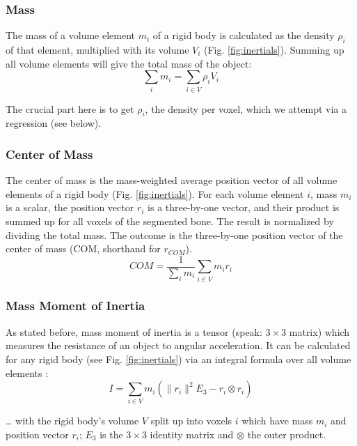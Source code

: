 \subsubsection{Mass}
\label{sec:org0aeb437}
The mass of a volume element \(m_{i}\) of a rigid body is calculated as the density \(\rho_{i}\) of that element, multiplied with its volume \(V_{i}\) (Fig. \ref{fig:inertials}).
Summing up all volume elements will give the total mass of the object:
\begin{equation}\label{eqn:mass}
\sum_{i} m_{i} = \sum\limits_{i \in V} \rho_{i} V_{i}
\end{equation}

The crucial part here is to get \(\rho_{i}\), the density per voxel, which we attempt via a regression (see below).


\subsubsection{Center of Mass}
\label{sec:org93d454c}
The center of mass is the mass-weighted average position vector of all volume elements of a rigid body (Fig. \ref{fig:inertials}).
For each volume element \(i\), mass \(m_{i}\) is a scalar, the position vector \(r_{i}\) is a three-by-one vector, and their product is summed up for all voxels of the segmented bone.
The result is normalized by dividing the total mass.
The outcome is the three-by-one position vector of the center of mass (COM, shorthand for \(r_{COM}\)).
\begin{equation}\label{eqn:com}
 COM = \frac{1}{\sum_i m_{i}} \sum\limits_{i \in V} m_{i} r_{i}
\end{equation}


\subsubsection{Mass Moment of Inertia}
\label{sec:org99c7578}
As stated before, mass moment of inertia is a tensor (speak: \(3\times 3\) matrix) which measures the resistance of an object to angular acceleration.
It can be calculated for any rigid body (see Fig. \ref{fig:inertials}) via an integral formula over all volume elements \citep{WikipediaMOI}:
\begin{equation}\label{eqn:mmoi}
 I = \sum\limits_{i \in V} m_{i} \left( \lVert r_{i} \rVert^{2}E_3 - r_{i} \otimes r_{i} \right)
\end{equation}

\ldots{} with the rigid body's volume \(V\) split up into voxels \(i\) which have mass \(m_i\) and position vector \(r_{i}\); \(E_{3}\) is the \(3\times 3\) identity matrix and \(\otimes\) the outer product.

